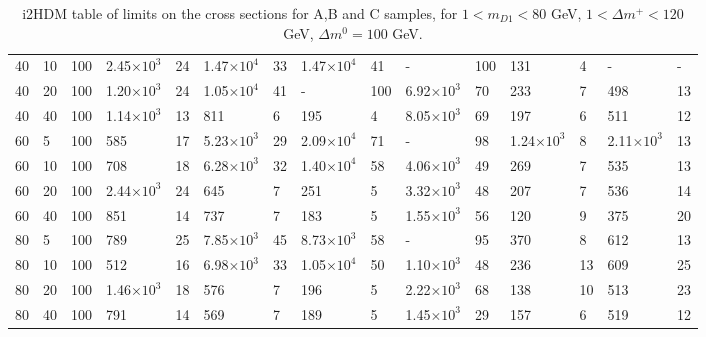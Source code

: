 \begin{table}[!ht]
\begin{center}
{\begin{tabular}{|l|l|l||l|l|l|l|l|l||l|l|l|l|l|l|}
40	&	10	&	100	&	2.45$\times10^3$	&	24	&	1.47$\times10^4$	&	33	&	1.47$\times10^4$	&	41	&	-	&	100	&	131	&	4	&	-	&	-	\\
40	&	20	&	100	&	1.20$\times10^3$	&	24	&	1.05$\times10^4$	&	41	&	-	&	100	&	6.92$\times10^3$	&	70	&	233	&	7	&	498	&	13	\\
40	&	40	&	100	&	1.14$\times10^3$	&	13	&	811	&	6	&	195	&	4	&	8.05$\times10^3$	&	69	&	197	&	6	&	511	&	12	\\
60	&	5	&	100	&	585	&	17	&	5.23$\times10^3$	&	29	&	2.09$\times10^4$	&	71	&	-	&	98	&	1.24$\times10^3$	&	8	&	2.11$\times10^3$	&	13	\\
60	&	10	&	100	&	708	&	18	&	6.28$\times10^3$	&	32	&	1.40$\times10^4$	&	58	&	4.06$\times10^3$	&	49	&	269	&	7	&	535	&	13	\\
60	&	20	&	100	&	2.44$\times10^3$	&	24	&	645	&	7	&	251	&	5	&	3.32$\times10^3$	&	48	&	207	&	7	&	536	&	14	\\
60	&	40	&	100	&	851	&	14	&	737	&	7	&	183	&	5	&	1.55$\times10^3$	&	56	&	120	&	9	&	375	&	20	\\
80	&	5	&	100	&	789	&	25	&	7.85$\times10^3$	&	45	&	8.73$\times10^3$	&	58	&	-	&	95	&	370	&	8	&	612	&	13	\\
80	&	10	&	100	&	512	&	16	&	6.98$\times10^3$	&	33	&	1.05$\times10^4$	&	50	&	1.10$\times10^3$	&	48	&	236	&	13	&	609	&	25	\\
80	&	20	&	100	&	1.46$\times10^3$	&	18	&	576	&	7	&	196	&	5	&	2.22$\times10^3$	&	68	&	138	&	10	&	513	&	23	\\
80	&	40	&	100	&	791	&	14	&	569	&	7	&	189	&	5	&	1.45$\times10^3$	&	29	&	157	&	6	&	519	&	12		
		\end{tabular}%
}
\caption{i2HDM table of limits on the cross sections for A,B and C samples, for $1<m_{D1}<80$ GeV, $1<\Delta m^+<120$ GeV, $\Delta m^0=100$ GeV.}
\label{tab:i2hdm_exc_3}
\end{center}
\end{table}

